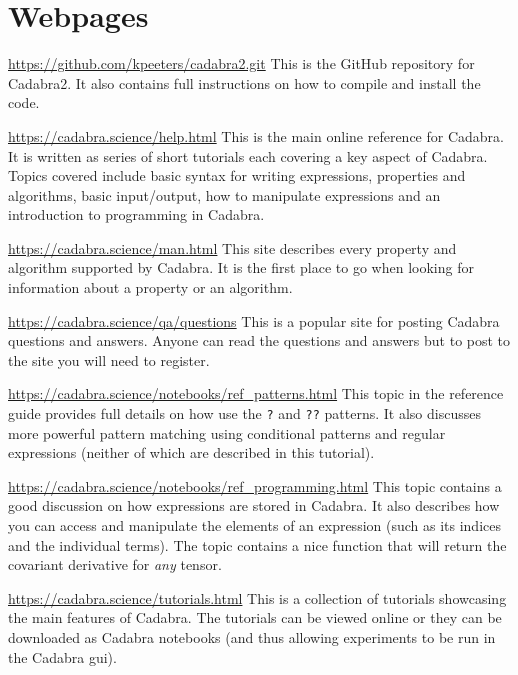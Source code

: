 \documentclass[a4paper,12pt]{article}
\numberwithin{equation}{section}%
\begin{document}
\lstset{numbers=none}

\clearpage

\section*{Webpages}

\url{https://github.com/kpeeters/cadabra2.git}\Break
This is the GitHub repository for Cadabra2. It also
contains full instructions on how to compile and install the code.

\url{https://cadabra.science/help.html}\Break
This is the main online reference for Cadabra. It is written as series of short tutorials
each covering a key aspect of Cadabra. Topics covered include basic syntax for writing
expressions, properties and algorithms, basic input/output, how to manipulate expressions and
an introduction to programming in Cadabra.

\url{https://cadabra.science/man.html}\Break
This site describes every property and algorithm supported by Cadabra. It is the
first place to go when looking for information about a property or an algorithm.

\url{https://cadabra.science/qa/questions}\Break
This is a popular site for posting Cadabra questions and answers. Anyone can read the
questions and answers but to post to the site you will need to register.

\url{https://cadabra.science/notebooks/ref_patterns.html}\Break
This topic in the reference guide provides full details on how use the \verb|?| and
\verb|??| patterns. It also discusses more powerful pattern matching using conditional
patterns and regular expressions (neither of which are described in this tutorial).

\url{https://cadabra.science/notebooks/ref_programming.html}\Break
This topic contains a good discussion on how expressions are stored in Cadabra. It also
describes how you can access and manipulate the elements of an expression (such as its
indices and the individual terms). The topic contains a nice function that will return the
covariant derivative for \emph{any} tensor.

\url{https://cadabra.science/tutorials.html}\Break
This is a collection of tutorials showcasing the main features of Cadabra. The tutorials can
be viewed online or they can be downloaded as Cadabra notebooks (and thus allowing
experiments to be run in the Cadabra gui).
\end{document}
